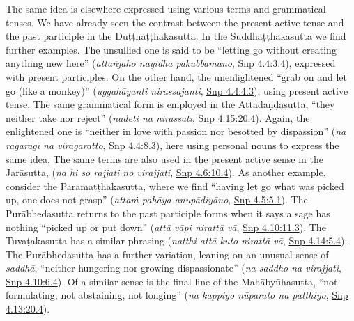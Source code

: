 \documentclass[12pt,openany]{book}%
\begin{document}
The same idea is elsewhere expressed using various terms and grammatical tenses. We have already seen the contrast between the present active tense and the past participle in the \textsanskrit{Duṭṭhaṭṭhakasutta}. In the \textsanskrit{Suddhaṭṭhakasutta} we find further examples. The unsullied one is said to be “letting go without creating anything new here” (\textit{\textsanskrit{attañjaho} nayidha \textsanskrit{pakubbamāno}}, \href{https://suttacentral.net/snp4.4/en/sujato\#3.4}{Snp 4.4:3.4}), expressed with present participles. On the other hand, the unenlightened “grab on and let go (like a monkey)” (\textit{\textsanskrit{uggahāyanti} nirassajanti}, \href{https://suttacentral.net/snp4.4/en/sujato\#4.3}{Snp 4.4:4.3}), using present active tense. The same grammatical form is employed in the \textsanskrit{Attadaṇḍasutta}, “they neither take nor reject” (\textit{\textsanskrit{nādeti} na \textsanskrit{nirassatī}}, \href{https://suttacentral.net/snp4.15/en/sujato\#20.4}{Snp 4.15:20.4}). Again, the enlightened one is “neither in love with passion nor besotted by dispassion” (\textit{na \textsanskrit{rāgarāgī} na \textsanskrit{virāgaratto}}, \href{https://suttacentral.net/snp4.4/en/sujato\#8.3}{Snp 4.4:8.3}), here using personal nouns to express the same idea. The same terms are also used in the present active sense in the \textsanskrit{Jarāsutta}, (\textit{na hi so rajjati no virajjati}, \href{https://suttacentral.net/snp4.6/en/sujato\#10.4}{Snp 4.6:10.4}). As another example, consider the \textsanskrit{Paramaṭṭhakasutta}, where we find “having let go what was picked up, one does not grasp” (\textit{\textsanskrit{attaṁ} \textsanskrit{pahāya} \textsanskrit{anupādiyāno}}, \href{https://suttacentral.net/snp4.5/en/sujato\#5.1}{Snp 4.5:5.1}). The \textsanskrit{Purābhedasutta} returns to the past participle forms when it says a sage has nothing “picked up or put down” (\textit{\textsanskrit{attā} \textsanskrit{vāpi} \textsanskrit{nirattā} \textsanskrit{vā}}, \href{https://suttacentral.net/snp4.10/en/sujato\#11.3}{Snp 4.10:11.3}). The \textsanskrit{Tuvaṭakasutta} has a similar phrasing (\textit{natthi \textsanskrit{attā} kuto \textsanskrit{nirattā} \textsanskrit{vā}}, \href{https://suttacentral.net/snp4.14/en/sujato\#5.4}{Snp 4.14:5.4}). The \textsanskrit{Purābhedasutta} has a further variation, leaning on an unusual sense of \textit{\textsanskrit{saddhā}}, “neither hungering nor growing dispassionate” (\textit{na saddho na virajjati}, \href{https://suttacentral.net/snp4.10/en/sujato\#6.4}{Snp 4.10:6.4}). Of a similar sense is the final line of the \textsanskrit{Mahābyūhasutta}, “not formulating, not abstaining, not longing” (\textit{na kappiyo \textsanskrit{nūparato} na patthiyo}, \href{https://suttacentral.net/snp4.13/en/sujato\#20.4}{Snp 4.13:20.4}).
\end{document}
